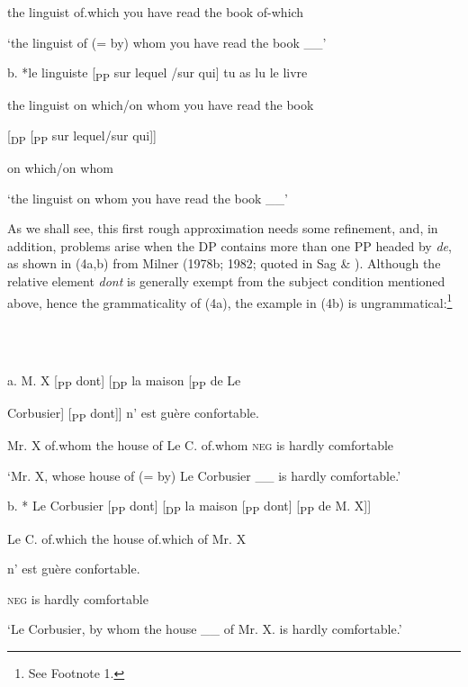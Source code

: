 \documentclass[output=paper]{langsci/langscibook}
\begin{document}
    the  linguist  of.which  you  have  read  the  book          of-which

    ‘the linguist of (= by) whom you have read the book \_\_’

  b.  *le  linguiste [\textsubscript{PP}  sur lequel /sur qui]  tu  as  lu  le  livre

      the  linguist  on which/on whom  you  have  read  the  book

    [\textsubscript{DP} [\textsubscript{PP}  sur lequel/sur qui]]

      on which/on whom

    ‘the linguist on whom you have read the book \_\_’

As we shall see, this first rough approximation needs some refinement, and, in addition, problems arise when the DP contains more than one PP headed by \textit{de}, as shown in (4a,b) from Milner (1978b; 1982; quoted in Sag \& \citealt{Godard1994}). Although the relative element \textit{dont} is generally exempt from the subject condition mentioned above, hence the grammaticality of (4a), the example in (4b) is ungrammatical:\footnote{See Footnote 1.}

\ea%
    \label{ex:key:4}
    \gll\\
        \\
    \glt
    \z

          a.  M.  X  [\textsubscript{PP} dont]\textsubscript{} [\textsubscript{DP}    la  maison  [\textsubscript{PP}  de  Le 

    Corbusier] [\textsubscript{PP} dont]]  n’  est  guère  confortable.

    Mr.  X    of.whom   the  house      of  Le         C.       of.whom   \textsc{neg}  is  hardly  comfortable

    ‘Mr. X, whose house of (= by) Le Corbusier \_\_ is hardly comfortable.’

  b.     *  Le Corbusier [\textsubscript{PP} dont] [\textsubscript{DP}  la  maison [\textsubscript{PP}  dont] [\textsubscript{PP}  de  M.  X]]

    Le C.      of.which  the  house    of.which  of  Mr. X

    n’  est  guère  confortable.

    \textsc{neg}  is  hardly  comfortable

    ‘Le Corbusier, by whom the house \_\_ of Mr. X. is hardly comfortable.’
\end{document}
